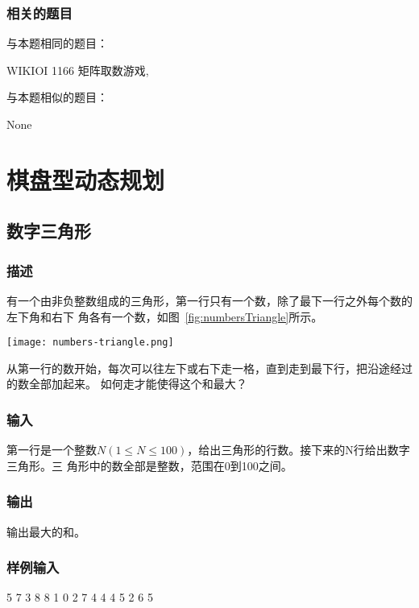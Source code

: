 \subsubsection{相关的题目}
与本题相同的题目：
\begindot
\item WIKIOI 1166 矩阵取数游戏, 
\myenddot

与本题相似的题目：
\begindot
\item None
\myenddot


\section{棋盘型动态规划} %

\subsection{数字三角形}

\subsubsection{描述}
有一个由非负整数组成的三角形，第一行只有一个数，除了最下一行之外每个数的左下角和右下
角各有一个数，如图~\ref{fig:numbersTriangle}所示。

\begin{center}
\texttt{[image: numbers-triangle.png]}\\
\label{fig:numbersTriangle}
\end{center}

从第一行的数开始，每次可以往左下或右下走一格，直到走到最下行，把沿途经过的数全部加起来。
如何走才能使得这个和最大？

\subsubsection{输入}
第一行是一个整数$N (1 \le N \leq 100)$，给出三角形的行数。接下来的N行给出数字三角形。三
角形中的数全部是整数，范围在0到100之间。

\subsubsection{输出}
输出最大的和。

\subsubsection{样例输入}
\begin{Code}
5
7
3 8 
8 1 0  
2 7 4 4 
4 5 2 6 5
\end{Code}

